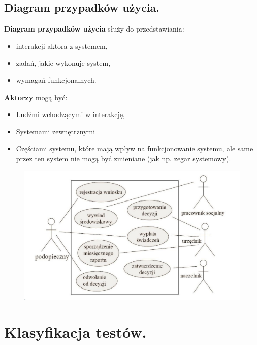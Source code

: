\documentclass[12pt]{article}
\begin{document}
    \subsection{Diagram przypadków użycia.}

    \begin{definition}
        \textbf{Diagram przypadków użycia} służy do przedstawiania:
        \begin{itemize}
            \item interakcji aktora z systemem,
            \item zadań, jakie wykonuje system,
            \item wymagań funkcjonalnych.
        \end{itemize}


        \textbf{Aktorzy} mogą być:
        \begin{itemize}
            \item Ludźmi wchodzącymi w interakcję,
            \item Systemami zewnętrznymi
            \item Częściami systemu, które mają wpływ na funkcjonowanie systemu, ale same przez ten system nie mogą
            być zmieniane (jak np. zegar systemowy).
        \end{itemize}
    \end{definition}

    \begin{figure}[H]
        \includegraphics[width=\linewidth]{uml_pu.png}
    \end{figure}

    \newpage

    \section{Klasyfikacja testów.}
\end{document}
